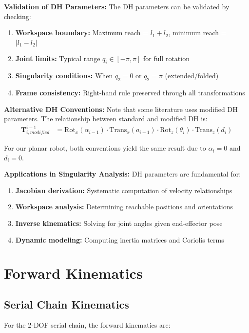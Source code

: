 \documentclass[11pt,a4paper]{article}
\begin{document}
\textbf{Validation of DH Parameters:}
The DH parameters can be validated by checking:
\begin{enumerate}
    \item \textbf{Workspace boundary:} Maximum reach = $l_1 + l_2$, minimum reach = $|l_1 - l_2|$
    \item \textbf{Joint limits:} Typical range $q_i \in [-\pi, \pi]$ for full rotation
    \item \textbf{Singularity conditions:} When $q_2 = 0$ or $q_2 = \pi$ (extended/folded)
    \item \textbf{Frame consistency:} Right-hand rule preserved through all transformations
\end{enumerate}

\textbf{Alternative DH Conventions:}
Note that some literature uses modified DH parameters. The relationship between standard and modified DH is:
\begin{align}
\bm{T}_{i,modified}^{i-1} &= \text{Rot}_{x}(\alpha_{i-1}) \cdot \text{Trans}_{x}(a_{i-1}) \cdot \text{Rot}_{z}(\theta_i) \cdot \text{Trans}_{z}(d_i)
\end{align}

For our planar robot, both conventions yield the same result due to $\alpha_i = 0$ and $d_i = 0$.

\textbf{Applications in Singularity Analysis:}
DH parameters are fundamental for:
\begin{enumerate}
    \item \textbf{Jacobian derivation:} Systematic computation of velocity relationships
    \item \textbf{Workspace analysis:} Determining reachable positions and orientations
    \item \textbf{Inverse kinematics:} Solving for joint angles given end-effector pose
    \item \textbf{Dynamic modeling:} Computing inertia matrices and Coriolis terms
\end{enumerate}

\section{Forward Kinematics}

\subsection{Serial Chain Kinematics}
For the 2-DOF serial chain, the forward kinematics are:
\end{document}
